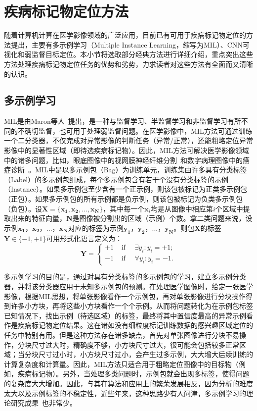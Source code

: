 \section{疾病标记物定位方法}\label{sec:related_work}
随着计算机计算在医学影像领域的广泛应用，目前已有可用于疾病标记物定位的方法提出，主要有多示例学习（Multiple Instance Learning，缩写为MIL）、CNN可视化和弱监督目标定位。本小节将选取部分经典方法进行详细介绍，重点突出这些方法处理疾病标记物定位任务的优势和劣势，力求读者对这些方法有全面而又清晰的认识。
\subsection{多示例学习}
MIL是由Maron等人~\cite{maron1998framework}提出，是一种与监督学习、半监督学习和非监督学习有所不同的不确切监督，也可用于处理弱监督问题。在医学影像中，MIL方法可通过训练一个二分类器，不仅完成对异常影像的判断任务（异常/正常），还能粗略定位异常影像中的显著性区域（即待选疾病标记物）。因此，MIL方法可解决医学影像领域中的诸多问题，比如，眼底图像中的视网膜神经纤维分割~\cite{manivannan2017subcategory}和数字病理图像中的癌症诊断~\cite{kandemir2014empowering}。MIL中是以多示例包（Bag）为训练单元，训练集由许多具有分类标签（Label）的多示例包组成，每个多示例包含有若干个没有分类标签的示例（Instance）。如果多示例包至少含有一个正示例，则该包被标记为正类多示例包（正包）。如果多示例包的所有示例都是负示例，则该包被标记为负类多示例包（负包）。设$\boldsymbol{X}=\{\boldsymbol{x_1,x_2,...,x_N}\}$，其中每一个$\boldsymbol{x}_i$均是从图像中相应第$i$个区域中提取出来的特征向量，$\boldsymbol{N}$是图像被分割出的区域（示例）个数。拿二类问题来说，设示例$\boldsymbol{x_1}$，$\boldsymbol{x_2}$，...，$\boldsymbol{x_N}$对应的标签为示例$\boldsymbol{y_1}$，$\boldsymbol{y_2}$，...，$\boldsymbol{y_N}$。则包$\boldsymbol{X}$的标签$\boldsymbol{Y}\in \{-1,+1\}$可用形式化语言定义为：
\begin{equation}
\boldsymbol{Y}=\left\{\begin{array}{ll}
{+1} & {\text { if } \quad \exists y_{i}: y_{i}=+1;} \\
{-1} & {\text { if } \quad \forall y_{i}: y_{i}=-1.}
\end{array}\right.
\end{equation}

\noindent 多示例学习的目的是，通过对具有分类标签的多示例包的学习，建立多示例分类器，并将该分类器应用于未知多示例包的预测。在处理医学图像时，给定一张医学影像，根据MIL思想，将单张影像看作一个示例包，再对单张影像进行分块操作得到许多小方块，再将这些小方块看作一个个示例。从而将问题转化为在示例包标签已知情况下，找出示例（待选区域）的标签，最终将其中置信度最高的异常示例看作是疾病标记物定位结果。这在诸如没有细粒度标记训练数据的感兴趣区域定位的任务中特别有用。但是这种方法存在诸多缺点，首先对单张图像进行分块不易操作，分块尺寸过大时，精确度不够，小方块尺寸过大，很可能会包括较多正常区域；当分块尺寸过小时，小方块尺寸过小，会产生过多示例，大大增大后续训练的计算复杂度和计算量。因此，MIL方法只适合用于粗略定位图像中的目标物（例如，疾病标记物）。另外，当处理多类问题时，示例包就会出现多标签，使得问题的复杂度大大增加。因此，与其在算法和应用上的繁荣发展相反，因为分析的难度太大以及示例标签的不稳定性，近些年来，这种思路少有人问津，多示例学习的理论研究成果~\cite{gondra2014object, wu2015deep,Maron1998MultipleInstanceLF}也非常少。

